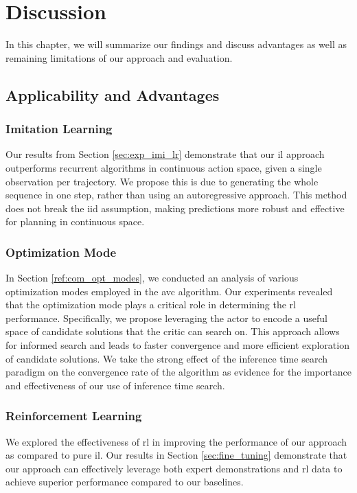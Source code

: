
\chapter{Discussion}
\label{chapter:Discussion}
In this chapter, we will summarize our findings and discuss advantages as well as remaining limitations of our approach and evaluation.
\section{Applicability and Advantages}
\subsection{Imitation Learning}
Our results from Section \ref{sec:exp_imi_lr} demonstrate that our \ac{il} approach outperforms recurrent algorithms in continuous action space, 
given a single observation per trajectory. We propose this is due to generating the whole sequence in one step, 
rather than using an autoregressive approach. This method does not break the \ac{iid} assumption, making predictions more robust and effective 
for planning in continuous space. \\

\subsection{Optimization Mode}
In Section \ref{ref:com_opt_modes}, we conducted an analysis of various optimization modes employed in the \ac{avc} algorithm. 
Our experiments revealed that the optimization mode plays a critical role in determining the \ac{rl} performance. 
Specifically, we propose leveraging the actor to encode a useful space of candidate solutions that the critic can search on. 
This approach allows for informed search and leads to faster convergence and more efficient exploration of candidate solutions. We take the strong effect of the inference time 
search paradigm on the convergence rate of the algorithm as evidence for the importance and effectiveness of our use of inference time search.

\subsection{Reinforcement Learning}
We explored the effectiveness of \ac{rl} in improving the performance of our approach as compared to pure \ac{il}. 
Our results in Section \ref{sec:fine_tuning} demonstrate that our approach can effectively leverage both expert demonstrations and \ac{rl} data to achieve 
superior performance compared to our baselines.\\

